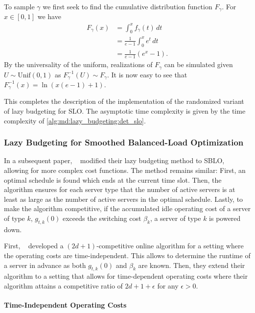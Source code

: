 To sample $\gamma$ we first seek to find the cumulative distribution function $F_{\gamma}$. For $x \in [0,1]$ we have \begin{align*}
    F_{\gamma}(x) &= \int_0^x f_{\gamma}(t) \,dt \\
                  &= \frac{1}{e-1} \int_0^x e^t \,dt \\
                  &= \frac{1}{e-1} (e^x - 1).
\end{align*} By the universality of the uniform, realizations of $F_{\gamma}$ can be simulated given $U \sim \text{Unif}(0,1)$ as $F_{\gamma}^{-1}(U) \sim F_{\gamma}$. It is now easy to see that $F_{\gamma}^{-1}(x) = \ln (x (e - 1) + 1)$.

This completes the description of the implementation of the randomized variant of lazy budgeting for SLO. The asymptotic time complexity is given by the time complexity of \cref{alg:md:lazy_budgeting:det_slo}.

\subsubsection{Lazy Budgeting for Smoothed Balanced-Load Optimization}

In a subsequent paper, \citeauthor{Albers2021_2}~\cite{Albers2021_2} modified their lazy budgeting method to SBLO, allowing for more complex cost functions. The method remains similar: First, an optimal schedule is found which ends at the current time slot. Then, the algorithm ensures for each server type that the number of active servers is at least as large as the number of active servers in the optimal schedule. Lastly, to make the algorithm competitive, if the accumulated idle operating cost of a server of type $k$, $g_{t,k}(0)$ exceeds the switching cost $\beta_k$, a server of type $k$ is powered down.

First, \citeauthor{Albers2021_2}~\cite{Albers2021_2} developed a $(2d+1)$-competitive online algorithm for a setting where the operating costs are time-independent. This allows to determine the runtime of a server in advance as both $g_{t,k}(0)$ and $\beta_k$ are known. Then, they extend their algorithm to a setting that allows for time-dependent operating costs where their algorithm attains a competitive ratio of $2d+1+\epsilon$ for any $\epsilon > 0$.

\paragraph{Time-Independent Operating Costs}

